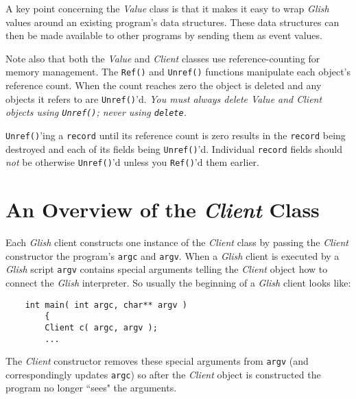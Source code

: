 A key point concerning the {\em Value} class is that it makes it easy to wrap
{\em Glish} values around an existing program's data structures.  These data
structures can then be made available to other programs by sending them
as event values.

Note
\label{ref-unref}
also that both the {\em Value} and {\em Client} classes use
reference-counting for memory management.  The {\tt Ref()} and {\tt Unref()}
functions manipulate each object's reference count.  When the count
reaches zero the object is deleted and any objects it refers to
are {\tt Unref()}'d.  {\em You must always delete Value and Client objects
using {\tt Unref()}; never using {\tt delete}.}

{\tt Unref()}'ing a {\tt record}
until its reference count is zero results in the {\tt record} being
destroyed and each of its fields being {\tt Unref()}'d.  Individual
{\tt record} fields should {\em not} be otherwise {\tt Unref()}'d unless
you {\tt Ref()}'d them earlier.

\section{An Overview of the {\em Client} Class}
\label{client-class-overview}

Each {\em Glish} client constructs one instance of the {\em Client} class
by passing the {\em Client} constructor the
program's {\tt argc} and
{\tt argv}.  When a {\em Glish} client is executed by a {\em Glish} 
script {\tt argv}
contains special arguments telling the {\em Client} object how to connect
the {\em Glish} interpreter.  So usually the beginning of a {\em Glish} client
looks like:
\begin{verbatim}
    int main( int argc, char** argv )
        {
        Client c( argc, argv );
        ...
\end{verbatim}
The {\em Client} constructor removes these special arguments from {\tt argv}
(and correspondingly updates {\tt argc}) so after the {\em Client} object
is constructed the program no longer ``sees" the arguments.

